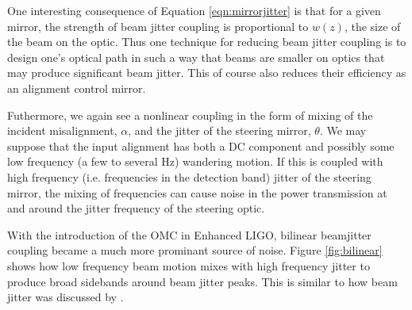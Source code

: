 One interesting consequence of Equation \ref{eqn:mirrorjitter} is that for a given mirror, the strength of beam jitter coupling is proportional to $w(z)$, the size of the beam on the optic. %
Thus one technique for reducing beam jitter coupling is to design one's optical path in such a way that beams are smaller on optics that may produce significant beam jitter. %
This of course also reduces their efficiency as an alignment control mirror.

Futhermore, we again see a nonlinear coupling in the form of mixing of the incident misalignment, $\alpha$, and the jitter of the steering mirror, $\theta$. %
We may suppose that the input alignment has both a DC component and possibly some low frequency (a few to several Hz) wandering motion. %
If this is coupled with high frequency (i.e. %
frequencies in the detection band) jitter of the steering mirror, the mixing of frequencies can cause noise in the power transmission at and around the jitter frequency of the steering optic.

With the introduction of the OMC in Enhanced LIGO, bilinear beamjitter coupling became a much more prominant source of noise. %
Figure \ref{fig:bilinear} shows how low frequency beam motion mixes with high frequency jitter to produce broad sidebands around beam jitter peaks. %
This is similar to how beam jitter was discussed by \citet{Tobin}.


